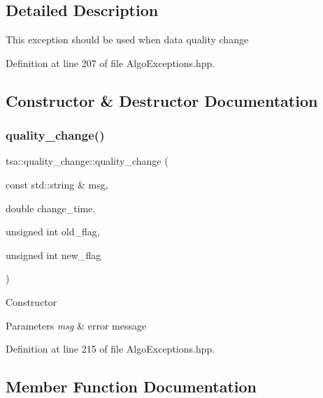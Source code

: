 \subsection{Detailed Description}
This exception should be used when data quality change 

Definition at line 207 of file Algo\+Exceptions.\+hpp.



\subsection{Constructor \& Destructor Documentation}
\mbox{\label{classtsa_1_1quality__change_af530cc58e7eeb50f31ddb700bfea79f4}} 
\subsubsection{\texorpdfstring{quality\+\_\+change()}{quality\_change()}}
{\footnotesize\ttfamily tsa\+::quality\+\_\+change\+::quality\+\_\+change (\begin{DoxyParamCaption}\item[{const std\+::string \&}]{msg,  }\item[{double}]{change\+\_\+time,  }\item[{unsigned int}]{old\+\_\+flag,  }\item[{unsigned int}]{new\+\_\+flag }\end{DoxyParamCaption})\hspace{0.3cm}{\ttfamily [inline]}}

Constructor


\begin{DoxyParams}{Parameters}
{\em msg} & error message \\
\hline
\end{DoxyParams}


Definition at line 215 of file Algo\+Exceptions.\+hpp.



\subsection{Member Function Documentation}
\mbox{\label{classtsa_1_1quality__change_a71190c89b87f044b190e67be16f4c1a4}} 
